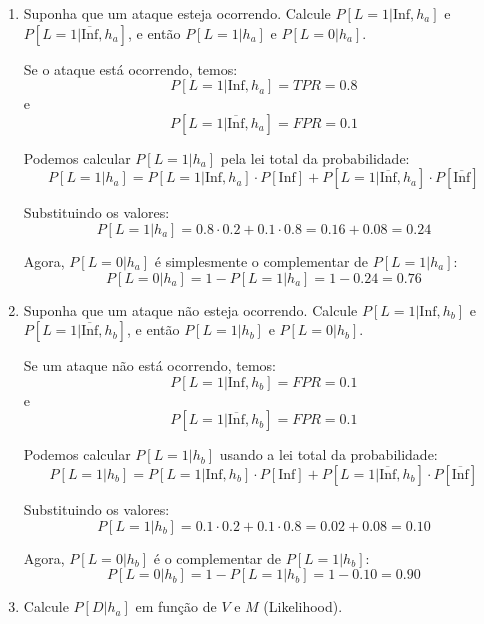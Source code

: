 \documentclass[12 pt]{article}
\begin{document}
\begin{enumerate}
    \item Suponha que um ataque esteja ocorrendo. Calcule $P[L = 1|\text{Inf}, h_a]$ e $P[L = 1|\overline{\text{Inf}}, h_a]$, e então $P[L = 1|h_a]$ e $P[L = 0|h_a]$.
    
    \begin{tcolorbox}[colback=white, colframe=black, title=Resposta:]
Se o ataque está ocorrendo, temos:
$$
P[L = 1|\text{Inf}, h_a] = TPR = 0.8
$$
e
$$
P[L = 1|\overline{\text{Inf}}, h_a] = FPR = 0.1
$$

Podemos calcular \( P[L = 1|h_a] \) pela lei total da probabilidade:
$$
P[L = 1|h_a] = P[L = 1|\text{Inf}, h_a] \cdot P[\text{Inf}] + P[L = 1|\overline{\text{Inf}}, h_a] \cdot P[\overline{\text{Inf}}]
$$

Substituindo os valores:
$$
P[L = 1|h_a] = 0.8 \cdot 0.2 + 0.1 \cdot 0.8 = 0.16 + 0.08 = 0.24
$$

Agora, \( P[L = 0|h_a] \) é simplesmente o complementar de \( P[L = 1|h_a] \):
$$
P[L = 0|h_a] = 1 - P[L = 1|h_a] = 1 - 0.24 = 0.76
$$
    
    \end{tcolorbox}

    \item Suponha que um ataque não esteja ocorrendo. Calcule $P[L = 1|\text{Inf}, h_b]$ e $P[L = 1|\overline{\text{Inf}}, h_b]$, e então $P[L = 1|h_b]$ e $P[L = 0|h_b]$.
    
    \begin{tcolorbox}[colback=white, colframe=black, title=Resposta:]

    Se um ataque não está ocorrendo, temos:
    $$
    P[L = 1|\text{Inf}, h_b] = FPR = 0.1
    $$
    e
    $$
    P[L = 1|\overline{\text{Inf}}, h_b] = FPR = 0.1
    $$
    
    Podemos calcular \( P[L = 1|h_b] \) usando a lei total da probabilidade:
    $$
    P[L = 1|h_b] = P[L = 1|\text{Inf}, h_b] \cdot P[\text{Inf}] + P[L = 1|\overline{\text{Inf}}, h_b] \cdot P[\overline{\text{Inf}}]
    $$
    
    Substituindo os valores:
    $$
    P[L = 1|h_b] = 0.1 \cdot 0.2 + 0.1 \cdot 0.8 = 0.02 + 0.08 = 0.10
    $$
    
    Agora, \( P[L = 0|h_b] \) é o complementar de \( P[L = 1|h_b] \):
    $$
    P[L = 0|h_b] = 1 - P[L = 1|h_b] = 1 - 0.10 = 0.90
    $$
    
\end{tcolorbox}

    \item Calcule $P[D|h_a]$ em função de $V$ e $M$ (Likelihood).
    

\end{enumerate}
\end{document}
